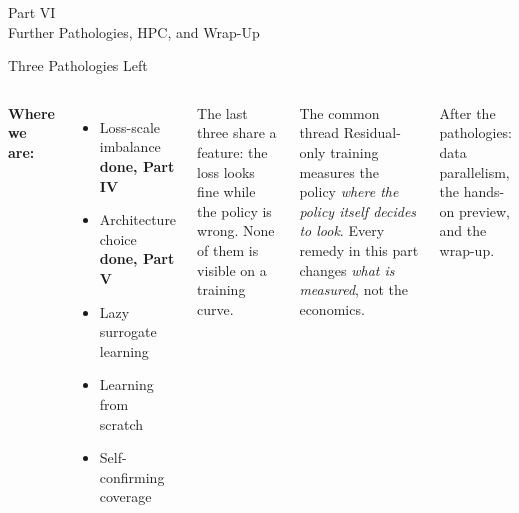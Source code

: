 \documentclass[aspectratio=169,11pt]{beamer}
\newcommand{\emphc}[1]{\textcolor{harvardcrimson}{#1}}
\begin{document}
\begin{frame}{}
\begin{center}
{\Huge \textcolor{uzhblue}{Part VI}}\\[0.8em]
{\LARGE Further Pathologies, HPC, and Wrap-Up}
\end{center}
\end{frame}

\begin{frame}{Three Pathologies Left}
\begin{columns}[T]
\textbf{Where we are:}
\begin{itemize}\setlength\itemsep{4pt}
  \item[(a)] Loss-scale imbalance \hfill \textcolor{softgreen}{\textbf{done, Part IV}}
  \item[(b)] Architecture choice \hfill \textcolor{softgreen}{\textbf{done, Part V}}
  \item[(c)] \emphc{Lazy surrogate learning}
  \item[(d)] \emphc{Learning from scratch}
  \item[(e)] \emphc{Self-confirming coverage}
\end{itemize}

\vspace{0.6em}
The last three share a feature: the loss looks fine while the policy is wrong. None of them is visible on a training curve.

\begin{alertblock}{The common thread}
Residual-only training measures the policy \emph{where the policy itself decides to look}. Every remedy in this part changes \emph{what is measured}, not the economics.
\end{alertblock}

\vspace{0.4em}
{\footnotesize After the pathologies: data parallelism, the hands-on preview, and the wrap-up.}
\end{columns}
\end{frame}
\end{document}
